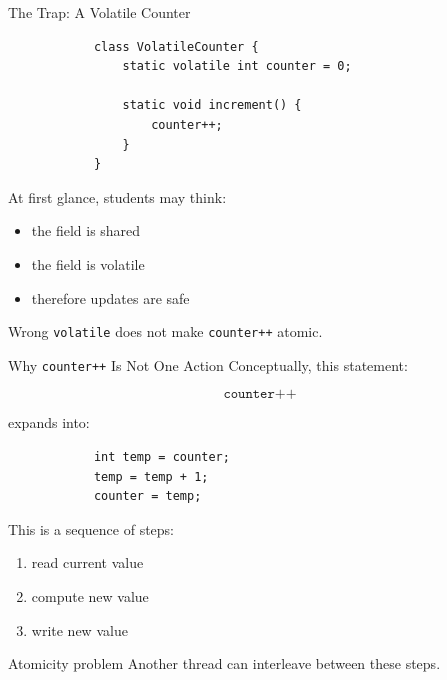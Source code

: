 \documentclass[aspectratio=169,11pt]{beamer}
\begin{document}
	\begin{frame}[fragile]{The Trap: A Volatile Counter}
		\begin{lstlisting}
			class VolatileCounter {
				static volatile int counter = 0;
				
				static void increment() {
					counter++;
				}
			}
		\end{lstlisting}
		
		\vspace{0.2cm}
		
		At first glance, students may think:
		
		\begin{itemize}
			\item the field is shared
			\item the field is volatile
			\item therefore updates are safe
		\end{itemize}
		
		\vspace{0.25cm}
		
		\begin{alertblock}{Wrong}
			\texttt{volatile} does not make \texttt{counter++} atomic.
		\end{alertblock}
	\end{frame}
	
	\begin{frame}[fragile]{Why \texttt{counter++} Is Not One Action}
		Conceptually, this statement:
		
		\[
		\texttt{counter++}
		\]
		
		expands into:
		
		\begin{lstlisting}
			int temp = counter;
			temp = temp + 1;
			counter = temp;
		\end{lstlisting}
		
		\vspace{0.3cm}
		
		This is a sequence of steps:
		\begin{enumerate}
			\item read current value
			\item compute new value
			\item write new value
		\end{enumerate}
		
		\vspace{0.3cm}
		
		\begin{alertblock}{Atomicity problem}
			Another thread can interleave between these steps.
		\end{alertblock}
	\end{frame}
	
\end{document}
